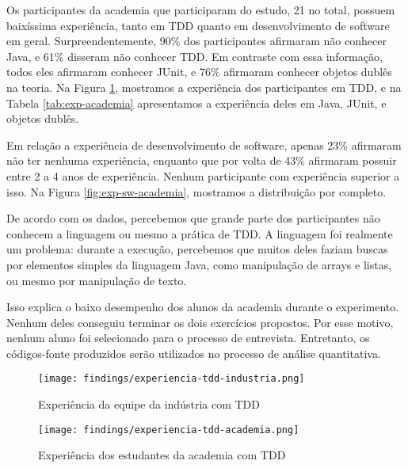 Os participantes da academia que participaram do estudo, 21 no total, possuem baixíssima experiência,
tanto em TDD quanto em desenvolvimento de software em geral. Surpreendentemente, 90\%
dos participantes afirmaram não conhecer Java, e 61\% disseram não conhecer TDD.
Em contraste com essa informação, todos eles afirmaram conhecer JUnit, e 76\% afirmaram
conhecer objetos dublês na teoria. 
Na Figura \ref{fig:exp-tdd-academia}, mostramos a experiência dos participantes em TDD, e
na Tabela \ref{tab:exp-academia} apresentamos a experiência deles em Java, JUnit, e objetos
dublês.

Em relação a experiência de desenvolvimento de software, apenas 23\% afirmaram não
ter nenhuma experiência, enquanto que por volta de 43\% afirmaram possuir
entre 2 a 4 anos de experiência. Nenhum participante com experiência superior a isso.
Na Figura \ref{fig:exp-sw-academia}, mostramos a distribuição por completo.

De acordo com os dados, percebemos que grande parte dos participantes não conhecem a linguagem ou
mesmo a prática de TDD. A linguagem foi realmente um problema: durante a execução, percebemos
que muitos deles faziam buscas por elementos simples da linguagem Java, como manipulação de arrays
e listas, ou mesmo por manipulação de texto.

Isso explica o baixo desempenho dos alunos da academia durante
o experimento. Nenhum deles conseguiu terminar os dois exercícios propostos. Por esse
motivo, nenhum aluno foi selecionado para o processo de entrevista. Entretanto,
os códigos-fonte produzidos serão utilizados no processo de análise quantitativa.

\begin{figure}[ht]
  \begin{minipage}[b]{0.45\linewidth}
    \centering
    \texttt{[image: findings/experiencia-tdd-industria.png]}
    \caption{Experiência da equipe da indústria com TDD}
    \label{fig:exp-tdd-industria}
  \end{minipage}
  \hspace{0.5cm}
  \begin{minipage}[b]{0.45\linewidth}
    \centering
    \texttt{[image: findings/experiencia-tdd-academia.png]}
    \caption{Experiência dos estudantes da academia com TDD}  
    \label{fig:exp-tdd-academia}
  \end{minipage}
\end{figure}

